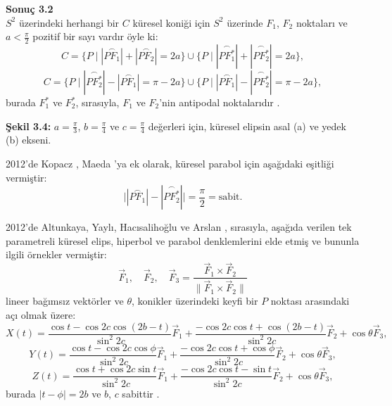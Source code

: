\documentclass[a4paper,12pt]{article}
\begin{document}
\textbf{Sonuç 3.2} \\
$S^2$ üzerindeki herhangi bir $C$ küresel koniği için $S^2$ üzerinde $F_1$, $F_2$ noktaları ve $a < \frac{\pi}{2}$ pozitif bir sayı vardır öyle ki:
\[
C = \{P \mid |\overset{\frown}{PF_1}| + |\overset{\frown}{PF_2}| = 2a\} \cup \{P \mid |\overset{\frown}{PF^*_1}| + |\overset{\frown}{PF^*_2}| = 2a\},
\]
\[
C = \{P \mid |\overset{\frown}{PF^*_2}| - |\overset{\frown}{PF_1}| = \pi - 2a\} \cup \{P \mid |\overset{\frown}{PF_1}| - |\overset{\frown}{PF^*_2}| = \pi - 2a\},
\]
burada $F^*_1$ ve $F^*_2$, sırasıyla, $F_1$ ve $F_2$'nin antipodal noktalarıdır \cite{ref1}.

\textbf{Şekil 3.4:} $a = \frac{\pi}{3}$, $b = \frac{\pi}{4}$ ve $c = \frac{\pi}{4}$ değerleri için, küresel elipsin asal (a) ve yedek (b) ekseni.

2012'de Kopacz \cite{ref2}, Maeda \cite{ref1}'ya ek olarak, küresel parabol için aşağıdaki eşitliği vermiştir:
\[
\big||\overset{\frown}{PF_1}| - |\overset{\frown}{PF^*_2}|\big| = \frac{\pi}{2} = \text{sabit}.
\]

2012'de Altunkaya, Yaylı, Hacısalihoğlu ve Arslan \cite{ref3}, sırasıyla, aşağıda verilen tek parametreli küresel elips, hiperbol ve parabol denklemlerini elde etmiş ve bununla ilgili örnekler vermiştir:
\[
\vec{F}_1, \quad \vec{F}_2, \quad \vec{F}_3 = \frac{\vec{F}_1 \times \vec{F}_2}{\|\vec{F}_1 \times \vec{F}_2\|}
\]
lineer bağımsız vektörler ve $\theta$, konikler üzerindeki keyfi bir $P$ noktası arasındaki açı olmak üzere:
\[
X(t) = \frac{\cos t - \cos 2c \cos(2b - t)}{\sin^2 2c} \vec{F}_1 + \frac{-\cos 2c \cos t + \cos(2b - t)}{\sin^2 2c} \vec{F}_2 + \cos \theta \vec{F}_3,
\]
\[
Y(t) = \frac{\cos t - \cos 2c \cos \phi}{\sin^2 2c} \vec{F}_1 + \frac{-\cos 2c \cos t + \cos \phi}{\sin^2 2c} \vec{F}_2 + \cos \theta \vec{F}_3,
\]
\[
Z(t) = \frac{\cos t + \cos 2c \sin t}{\sin^2 2c} \vec{F}_1 + \frac{-\cos 2c \cos t - \sin t}{\sin^2 2c} \vec{F}_2 + \cos \theta \vec{F}_3,
\]
burada $|t - \phi| = 2b$ ve $b$, $c$ sabittir \cite{ref3}.
\end{document}
